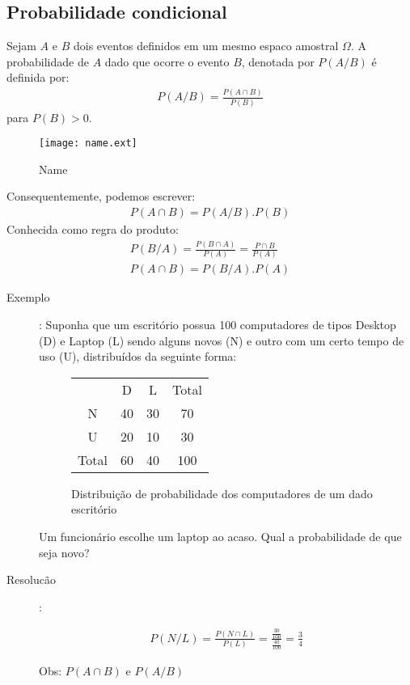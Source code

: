 \documentclass[11pt,a4paper]{book}
\begin{document}
\begin{description}
\begin{enumerate}[leftmargin=*, label=\Roman*., widest=IV, align=left]
\begin{description}
\subsection{Probabilidade condicional}
Sejam $A$ e $B$ dois eventos definidos em um mesmo espaco amostral $\Omega$.
A probabilidade de $A$  dado que ocorre o evento $B$, denotada por $P(A/B)$ é definida por:
\begin{align}
  P(A/B)= \frac{P(A\cap B)}{P(B)}
\end{align}
para $P(B)>0$. 
\begin{figure}[htpb]
  \centering
  \texttt{[image: name.ext]}
  \caption{Name}
  \label{fig:15}
\end{figure}
Consequentemente, podemos escrever:
\begin{align}
  P(A\cap B)= P(A/B).P(B)
\end{align}
Conhecida como regra do produto:
\begin{align}
  P(B/A)= \frac{P(B \cap A)}{P(A)}= \frac{P\cap B}{P(A)}\\
  P(A \cap B)= P(B/A).P(A)
\end{align}
\begin{description}
  \item [Exemplo]: Suponha que um escritório possua 100 computadores de tipos Desktop (D) e 
Laptop (L) sendo alguns novos (N) e outro com um certo tempo de uso (U), distribuídos da seguinte forma:
\begin{figure} 
  \centering
  \begin{tabular}{c c c c}
    \toprule
    &D&L&Total\\ \cmidrule{2-4}
    N&40&30&70\\ \cmidrule{2-4}
    U&20&10&30\\ \cmidrule{2-4}
    Total&60&40&100 \\\bottomrule
  \end{tabular}
  \label{fig:16}
  \caption{Distribuição de probabilidade dos computadores de um dado escritório}
\end{figure}
Um funcionário escolhe um laptop ao acaso. Qual a probabilidade de que seja novo?

\item[Resolucão]: 

\begin{align*}
  P(N/L)= \frac{P(N \cap L)}{P(L)}= \frac{\frac{30}{100}}{\frac{40}{100}}=\frac{3}{4}
\end{align*}

Obs: $P(A \cap B)$ e $P(A/B)$
\end{description}

\end{description}
\end{enumerate}
\end{description}
\end{document}
